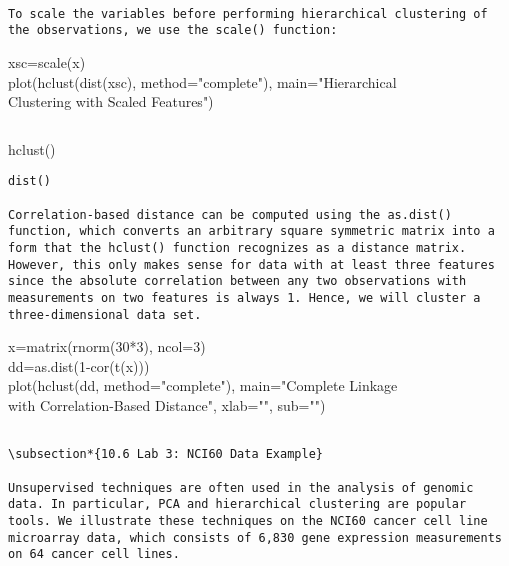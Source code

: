 \documentclass[10pt]{article}
\begin{document}
\begin{verbatim}

To scale the variables before performing hierarchical clustering of the observations, we use the scale() function:
\end{verbatim}

\begin{displayquote}
xsc=scale(x)\\
plot(hclust(dist(xsc), method="complete"), main="Hierarchical\\
Clustering with Scaled Features")
\end{displayquote}

\begin{verbatim}

\end{verbatim}

hclust()

\begin{verbatim}
dist()

Correlation-based distance can be computed using the as.dist() function, which converts an arbitrary square symmetric matrix into a form that the hclust() function recognizes as a distance matrix. However, this only makes sense for data with at least three features since the absolute correlation between any two observations with measurements on two features is always 1. Hence, we will cluster a three-dimensional data set.
\end{verbatim}

\begin{displayquote}
x=matrix(rnorm(30*3), ncol=3)\\
dd=as.dist(1-cor(t(x)))\\
plot(hclust(dd, method="complete"), main="Complete Linkage\\
with Correlation-Based Distance", xlab="", sub="")
\end{displayquote}

\begin{verbatim}

\subsection*{10.6 Lab 3: NCI60 Data Example}

Unsupervised techniques are often used in the analysis of genomic data. In particular, PCA and hierarchical clustering are popular tools. We illustrate these techniques on the NCI60 cancer cell line microarray data, which consists of 6,830 gene expression measurements on 64 cancer cell lines.
\end{verbatim}
\end{document}
